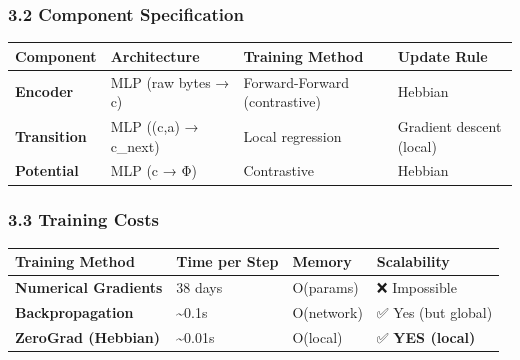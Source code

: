 \documentclass[
  11pt,
  a4paper,
]{article}
\begin{document}
\subsubsection{3.2 Component
Specification}\label{component-specification}

\begin{longtable}[]{@{}
  >{\raggedright\arraybackslash}p{}
  >{\raggedright\arraybackslash}p{}
  >{\raggedright\arraybackslash}p{}
  >{\raggedright\arraybackslash}p{}@{}}
\toprule\noalign{}
\begin{minipage}[b]{\linewidth}\raggedright
Component
\end{minipage} & \begin{minipage}[b]{\linewidth}\raggedright
Architecture
\end{minipage} & \begin{minipage}[b]{\linewidth}\raggedright
Training Method
\end{minipage} & \begin{minipage}[b]{\linewidth}\raggedright
Update Rule
\end{minipage} \\
\midrule\noalign{}
\endhead
\bottomrule\noalign{}
\endlastfoot
\textbf{Encoder} & MLP (raw bytes → c) & Forward-Forward (contrastive) &
Hebbian \\
\textbf{Transition} & MLP ((c,a) → c\_next) & Local regression &
Gradient descent (local) \\
\textbf{Potential} & MLP (c → Φ) & Contrastive & Hebbian \\
\end{longtable}

\subsubsection{3.3 Training Costs}\label{training-costs}

\begin{longtable}[]{@{}llll@{}}
\toprule\noalign{}
Training Method & Time per Step & Memory & Scalability \\
\midrule\noalign{}
\endhead
\bottomrule\noalign{}
\endlastfoot
\textbf{Numerical Gradients} & 38 days & O(params) & ❌ Impossible \\
\textbf{Backpropagation} & \textasciitilde0.1s & O(network) & ✅ Yes
(but global) \\
\textbf{ZeroGrad (Hebbian)} & \textasciitilde0.01s & O(local) & ✅
\textbf{YES (local)} \\
\end{longtable}
\end{document}
